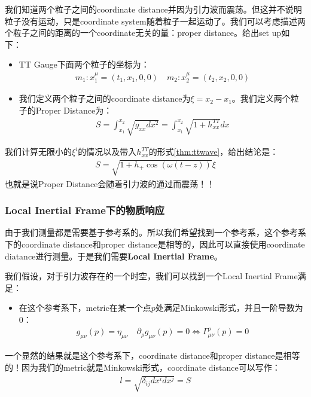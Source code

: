 \bigskip
{}

我们知道两个粒子之间的coordinate distance并因为引力波而震荡。但这并不说明粒子没有运动，只是coordinate
system随着粒子一起运动了。我们可以考虑描述两个粒子之间的距离的一个coordinate无关的量：proper distance。给出set up如下：
\begin{itemize}
  \item TT Gauge下面两个粒子的坐标为：
    \begin{align}
      m_1 : x^{\mu}_1 = (t_1,x_1,0,0) \quad m_2 : x^{\mu}_2 = (t_2,x_2,0,0)
    \end{align}
  \item   我们定义两个粒子之间的coordinate distance为$ \xi = x_2 - x_1
    $。我们定义两个粒子的Proper Distance为：
    \begin{align}
      S = \int_{x_1}^{x_2} \sqrt{g_{xx}dx^2} = \int_{x_1}^{x_2}
      \sqrt{1 + h_{xx}^{TT}} dx
    \end{align}
\end{itemize}

我们计算无限小的$ \xi^i $的情况以及带入$ h_{xx}^{TT} $的形式\cref{thm:ttwave}，给出结论是：
\begin{align}
  S = \sqrt{1+ h_+ \cos (\omega(t-z))} \xi
\end{align}
也就是说Proper Distance会随着引力波的通过而震荡！！

\subsubsection{Local Inertial Frame下的物质响应}

由于我们测量都是需要基于参考系的。所以我们希望找到一个参考系，这个参考系下的coordinate distance和proper
distance是相等的，因此可以直接使用coordinate diatance进行测量。于是我们需要\textbf{Local
Inertial Frame}。

\bigskip
{}

我们假设，对于引力波存在的一个时空，我们可以找到一个Local Inertial Frame满足：
\begin{itemize}
  \item 在这个参考系下，metric在某一个点$ p $处满足Minkowski形式，并且一阶导数为0：
    \begin{align}
      g_{\mu\nu}(p) = \eta_{\mu\nu} \quad \partial_\rho g_{\mu\nu}(p)
      = 0 \Leftrightarrow \Gamma_{\mu\nu}^\rho(p) = 0
    \end{align}
\end{itemize}
一个显然的结果就是这个参考系下，coordinate distance和proper
distance是相等的！因为我们的metric就是Minkowski形式，coordinate distance可以写作：
\begin{align}
  l = \sqrt{\delta_{ij} dx^i dx^j} = S
\end{align}

